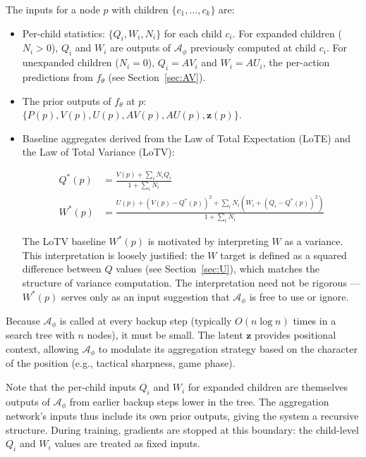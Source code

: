 \documentclass[11pt]{article}
\begin{document}
The inputs for a node $p$ with children $\{c_1, \ldots, c_k\}$ are:
\begin{itemize}[noitemsep]
  \item Per-child statistics: $\{Q_i, W_i, N_i\}$ for each child $c_i$.
        For expanded children ($N_i > 0$), $Q_i$ and $W_i$ are outputs of
        $\mathcal{A}_\phi$ previously computed at child $c_i$.
        For unexpanded children ($N_i = 0$), $Q_i = AV_i$ and $W_i = AU_i$,
        the per-action predictions from $f_\theta$ (see Section~\ref{sec:AV}).
  \item The prior outputs of $f_\theta$ at $p$: $\{P(p), V(p), U(p), AV(p), AU(p), 
        \mathbf{z}(p)\}$.
  \item Baseline aggregates derived from the Law of Total Expectation (LoTE) and
        the Law of Total Variance (LoTV):

        \begin{align*}
Q^*(p) &=  \frac{V(p) + \sum_i N_iQ_i}{1 + \sum_i N_i} \\
W^*(p) &= \frac{U(p) + (V(p) - Q^*(p))^2 + \sum_i N_i(W_i + (Q_i - Q^*(p))^2)}{1 + \sum_i N_i}
        \end{align*}

  The LoTV baseline $W^*(p)$ is motivated by interpreting $W$ as a variance.
  This interpretation is loosely justified: the $W$ target is defined as a
  squared difference between $Q$ values (see Section~\ref{sec:U}), which
  matches the structure of variance computation. The interpretation need not be
  rigorous --- $W^*(p)$ serves only as an input suggestion that
  $\mathcal{A}_\phi$ is free to use or ignore.
\end{itemize}

Because $\mathcal{A}_\phi$ is called at every backup step (typically
$O(n \log n)$ times in a search tree with $n$ nodes), it must be small. The
latent $\mathbf{z}$ provides positional context, allowing $\mathcal{A}_\phi$
to modulate its aggregation strategy based on the character of the position
(e.g., tactical sharpness, game phase).

Note that the per-child inputs $Q_i$ and $W_i$ for expanded children are
themselves outputs of $\mathcal{A}_\phi$ from earlier backup steps lower in the
tree. The aggregation network's inputs thus include its own prior outputs,
giving the system a recursive structure. During training, gradients are stopped
at this boundary: the child-level $Q_i$ and $W_i$ values are treated as fixed
inputs.

\end{document}
